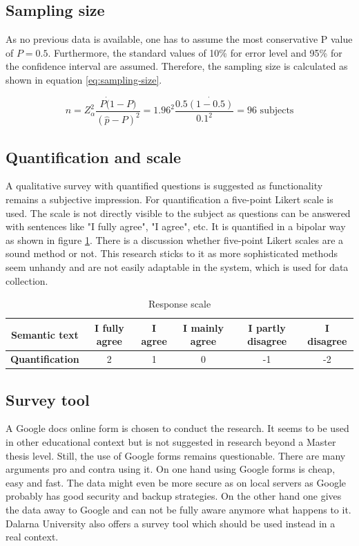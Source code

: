 \documentclass[12pt,a4paper,paper=a4,oneside,titlepage,pdftex]{scrartcl}
\begin{document}
\subsection{Sampling size}
As no previous data is available, one has to assume the most conservative P value of $ P = 0.5 $. Furthermore, the standard values of 10\% for error level and 95\% for the confidence interval are assumed. Therefore, the sampling size is calculated as shown in equation \ref{eq:sampling-size}.

\begin{equation}
n = Z^2_\alpha \frac{P\dot(1-P)}{(\hat{p}-P)^2} = 1.96^2\frac{0.5\dot{(1-0.5)}}{0.1^2}=96 \text{ subjects}
\label{eq:sampling-size}
\end{equation}

\subsection{Quantification and scale}

A qualitative survey \citep{sofaer1999qualitative} with quantified questions is suggested as functionality remains a subjective impression. For quantification a five-point Likert scale \citep{likert1932technique} is used. The scale is not directly visible to the subject as questions can be answered with sentences like "I fully agree", "I agree", etc. It is quantified in a bipolar way as shown in figure \ref{tab:response-scale}.  There is a discussion \citep{cummins2000we} whether five-point Likert scales are a sound method or not. This research sticks to it as more sophisticated methods \citep{chimi2009likert} seem unhandy and are not easily adaptable in the system, which is used for data collection.

\begin{table}[h!]
\begin{tabular}{|c|| c|c|c|c|c|}
\hline
\textbf{Semantic text} & I fully agree & I agree & I mainly agree & I partly disagree & I disagree \\ \hline
\textbf{Quantification} & 2 & 1 & 0 & -1 & -2 \\ \hline
\end{tabular}
	\caption{Response scale}
	\label{tab:response-scale}
\end{table}


\subsection{Survey tool}
A Google docs online form is chosen to conduct the research. It seems to be used in other educational context \citep{gehringer2010daily} but is not suggested in research beyond a Master thesis level. Still, the use of Google forms remains questionable. There are many arguments pro and contra using it. On one hand using Google forms is cheap, easy and fast. The data might even be more secure as on local servers as Google probably has good security and backup strategies. On the other hand one gives the data away to Google and can not be fully aware anymore what happens to it. Dalarna University also offers a survey tool which should be used instead in a real context.
\end{document}
